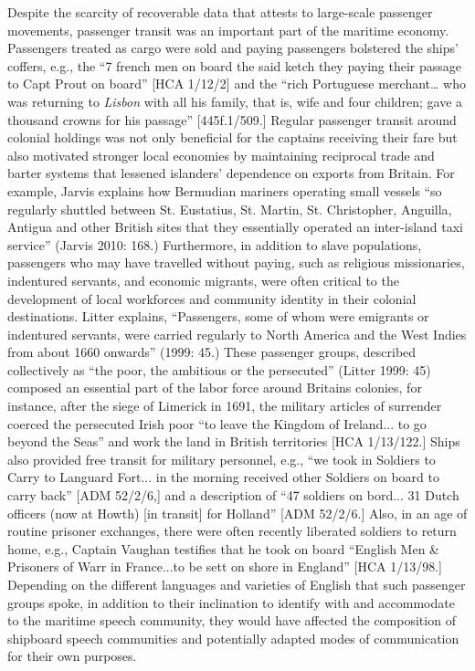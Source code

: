 \begin{styleStandard}
Despite the scarcity of recoverable data that attests to large-scale passenger movements, passenger transit was an important part of the maritime economy. Passengers treated as cargo were sold and paying passengers bolstered the ships’ coffers, e.g., the “7 french men on board the said ketch they paying their passage to Capt Prout on board” [HCA 1/12/2] and the “rich Portuguese merchant… who was returning to \textit{Lisbon} with all his family, that is, wife and four children; gave a thousand crowns for his passage” [445f.1/509.] Regular passenger transit around colonial holdings was not only beneficial for the captains receiving their fare but also motivated stronger local economies by maintaining reciprocal trade and barter systems that lessened islanders’ dependence on exports from Britain. For example, Jarvis explains how Bermudian mariners operating small vessels “so regularly shuttled between St. Eustatius, St. Martin, St. Christopher, Anguilla, Antigua and other British sites that they essentially operated an inter-island taxi service” (Jarvis 2010: 168.) Furthermore, in addition to slave populations, passengers who may have travelled without paying, such as religious missionaries, indentured servants, and economic migrants, were often critical to the development of local workforces and community identity in their colonial destinations. Litter explains, “Passengers, some of whom were emigrants or indentured servants, were carried regularly to North America and the West Indies from about 1660 onwards” (1999: 45.) These passenger groups, described collectively as “the poor, the ambitious or the persecuted” (Litter 1999: 45) composed an essential part of the labor force around Britain{\textquotesingle}s colonies, for instance, after the siege of Limerick in 1691, the military articles of surrender coerced the persecuted Irish poor “to leave the Kingdom of Ireland... to go beyond the Seas” and work the land in British territories [HCA 1/13/122.] Ships also provided free transit for military personnel, e.g., “we took in Soldiers to Carry to Languard Fort... in the morning received other Soldiers on board to carry back” [ADM 52/2/6,] and a description of “47 soldiers on bord... 31 Dutch officers (now at Howth) [in transit] for Holland” [ADM 52/2/6.] Also, in an age of routine prisoner exchanges, there were often recently liberated soldiers to return home, e.g., Captain Vaughan testifies that he took on board “English Men \& Prisoners of Warr in France...to be sett on shore in England” [HCA 1/13/98.] Depending on the different languages and varieties of English that such passenger groups spoke, in addition to their inclination to identify with and accommodate to the maritime speech community, they would have affected the composition of shipboard speech communities and potentially adapted modes of communication for their own purposes. 
\end{styleStandard}


